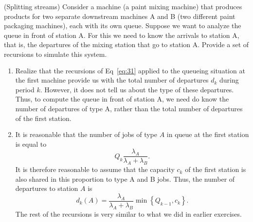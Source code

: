 \begin{question} (Splitting streams)
  Consider a machine (a paint mixing machine) that produces products
  for two separate downstream machines A and B (two different paint
  packaging machines), each with its own queue.  Suppose we want to
  analyze the queue in front of station A. For this we need to know
  the arrivals to station A, that is, the departures of the mixing
  station that go to station A. Provide a set of recursions to
  simulate this system.
  \begin{solution}
\begin{enumerate}
\item Realize that the recursions of Eq~\eqref{eq:31} applied to the
  queueing situation at the first machine provide us with the total
  number of departures $d_k$ during period $k$. However, it does not
  tell us about the type of these departures. Thus, to compute the
  queue in front of station A, we need do know the number of
  departures of type A, rather than the total number of departures of
  the first station.
\item It is reasonable that the number of jobs of type $A$ in queue at
  the first station is equal to
  \begin{equation*}
  Q_k \frac{\lambda_A}{\lambda_A + \lambda_B}.
  \end{equation*}
  It is therefore reasonable to assume that the capacity $c_k$ of the
  first station is also shared in this proportion to type A and B
  jobs. Thus, the number of departures to station $A$ is
  \begin{equation*}
    d_k(A) = \frac{\lambda_A}{\lambda_A+\lambda_B} \min\left\{ Q_{k-1}, c_k\right\}.
  \end{equation*}
 The rest of the recursions is very similar to what we did in earlier exercises.
\end{enumerate}
  \end{solution}
\end{question}



